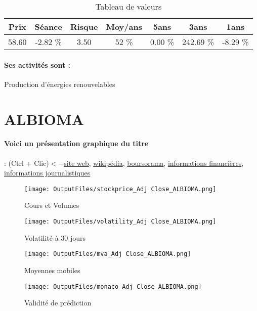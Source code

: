 \documentclass[11pt,a4paper]{report}%
\begin{document}
\begin{table}[H]
  \centering
    \begin{tabular}{|c|c|c|c|c|c|c|}
    \hline
    Prix & Séance & Risque  & Moy/ans & 5ans & 3ans & 1ans \\
    \hline
    58.60 &    -2.82 \%    & 3.50 & 52 \% & 0.00 \% & 242.69 \% & -8.29 \% \\
    \hline
    \end{tabular}%
        \label{tab:table_NEOEN}%
      \caption{Tableau de valeurs}
\end{table}%

\paragraph{Ses activités sont : } Production d’énergies renouvelables 
    
    \newpage

\section{ALBIOMA}

\paragraph{Voici un présentation graphique du titre} : (Ctrl + Clic)$<-$\href{https://www.albioma.com/}{site web}, \href{https://fr.wikipedia.org/wiki/Albioma}{wikipédia}, \href{https://www.boursorama.com/cours/1rPABIO}{boursorama}, \href{https://www.qwant.com/?q=site:https:%2f%2fwww.easybourse.com%2faction-societe%2fALBIOMA&t=web&client=ext-firefox-hp}{informations financières}, \href{https://bourse.lerevenu.com/cours-de-bourse/fiche-valeur-synthese/ALBIOMA/ABIO-FR}{informations journalistiques}
\begin{figure}[!htb]
   \begin{minipage}{0.5\textwidth}
     \centering
     \texttt{[image: OutputFiles/stockprice\_Adj Close\_ALBIOMA.png]}
     \caption{Cours et Volumes}\label{Fig:price_ALBIOMA}
   \end{minipage}\hfill
   \begin{minipage}{0.5\textwidth}
     \centering
     \texttt{[image: OutputFiles/volatility\_Adj Close\_ALBIOMA.png]}
     \caption{Volatilité à 30 jours}\label{Fig:volat_ALBIOMA}
   \end{minipage}
\end{figure}
\begin{figure}[!htb]
   \begin{minipage}{0.5\textwidth}
     \centering
     \texttt{[image: OutputFiles/mva\_Adj Close\_ALBIOMA.png]}
     \caption{Moyennes mobiles}\label{Fig:mva_ALBIOMA}
   \end{minipage}\hfill
   \begin{minipage}{0.5\textwidth}
     \centering
     \texttt{[image: OutputFiles/monaco\_Adj Close\_ALBIOMA.png]}
     \caption{Validité de prédiction}\label{Fig:prediction_ALBIOMA}
   \end{minipage}
\end{figure}
\end{document}
